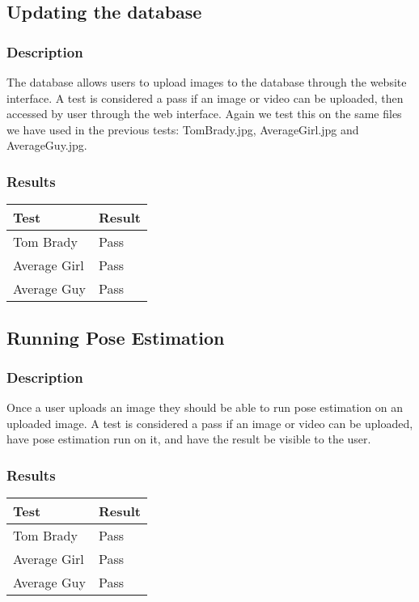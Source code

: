 \documentclass{scrreprt}
\begin{document}
\subsection{Updating the database}
\subsubsection{Description}
\begin{flushleft}
The database allows users to upload images to the database through the website
interface. A test is considered a pass if an image or video can be uploaded,
then accessed by user through the web interface.  Again we test this on the
same files we have used in the previous tests: TomBrady.jpg, AverageGirl.jpg
and AverageGuy.jpg.
\end{flushleft}
\subsubsection{Results}
 \centering
 \begin{tabular}{||p{2.5cm}|p{2.5cm}||}
 \hline
 \textbf Test & \textbf Result\\
 \hline\hline
  Tom Brady & Pass  \\
   \hline\hline
  Average Girl & Pass  \\
   \hline\hline
  Average Guy & Pass  \\
\hline

 \hline
 \end{tabular}

\subsection{Running Pose Estimation}
\subsubsection{Description}
\begin{flushleft}
Once a user uploads an image they should be able to run pose estimation on an
uploaded image. A test is considered a pass if an image or video can be
uploaded, have pose estimation run on it, and have the result be visible to the
user.
\end{flushleft}
\subsubsection{Results}
 \centering
 \begin{tabular}{||p{2.5cm}|p{2.5cm}||}
 \hline
 \textbf Test & \textbf Result\\
 \hline\hline
  Tom Brady & Pass  \\
   \hline\hline
  Average Girl & Pass  \\
   \hline\hline
  Average Guy & Pass  \\
\hline

 \hline
 \end{tabular}
\end{document}
